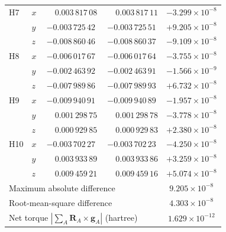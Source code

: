 \begin{longtable}{llccc}
  H7  & $x$ & $\phantom{-}0.003\,817\,08$ & $\phantom{-}0.003\,817\,11$ & $-3.299 \times 10^{-8}$ \\
      & $y$ & $-0.003\,725\,42$ & $-0.003\,725\,51$ & $+9.205 \times 10^{-8}$ \\
      & $z$ & $-0.008\,860\,46$ & $-0.008\,860\,37$ & $-9.109 \times 10^{-8}$ \\[2pt]
  H8  & $x$ & $-0.006\,017\,67$ & $-0.006\,017\,64$ & $-3.755 \times 10^{-8}$ \\
      & $y$ & $-0.002\,463\,92$ & $-0.002\,463\,91$ & $-1.566 \times 10^{-9}$ \\
      & $z$ & $-0.007\,989\,86$ & $-0.007\,989\,93$ & $+6.732 \times 10^{-8}$ \\[2pt]
  H9  & $x$ & $-0.009\,940\,91$ & $-0.009\,940\,89$ & $-1.957 \times 10^{-8}$ \\
      & $y$ & $\phantom{-}0.001\,298\,75$ & $\phantom{-}0.001\,298\,78$ & $-3.778 \times 10^{-8}$ \\
      & $z$ & $\phantom{-}0.000\,929\,85$ & $\phantom{-}0.000\,929\,83$ & $+2.380 \times 10^{-8}$ \\[2pt]
  H10 & $x$ & $-0.003\,702\,27$ & $-0.003\,702\,23$ & $-4.250 \times 10^{-8}$ \\
      & $y$ & $\phantom{-}0.003\,933\,89$ & $\phantom{-}0.003\,933\,86$ & $+3.259 \times 10^{-8}$ \\
      & $z$ & $\phantom{-}0.009\,459\,21$ & $\phantom{-}0.009\,459\,16$ & $+5.074 \times 10^{-8}$ \\
  \hline
  \multicolumn{4}{l}{Maximum absolute difference} & $9.205 \times 10^{-8}$ \\
  \multicolumn{4}{l}{Root-mean-square difference} & $4.303 \times 10^{-8}$ \\
  \multicolumn{4}{l}{Net torque $|\sum_A \mathbf{R}_A \times \mathbf{g}_A|$ (hartree)} & $1.629 \times 10^{-12}$ \\
  \hline
\end{longtable}
